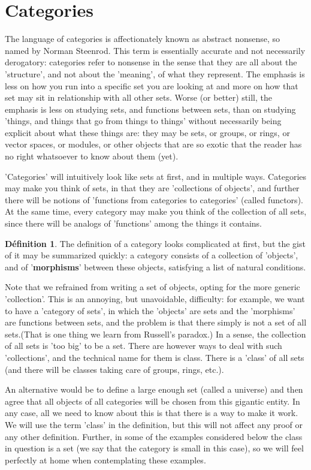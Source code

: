 \documentclass[12pt]{book}
\theoremstyle{definition}\newtheorem{dfn}{Définition}[chapter]
\theoremstyle{plain}\newtheorem{thm}{Théorème}[chapter]
\theoremstyle{plain}\newtheorem{prp}{Proposition}[chapter]
\theoremstyle{plain}\newtheorem{lem}{\bf Lemme}[chapter]
\theoremstyle{plain}\newtheorem{axm}{\bf Axiome}[chapter]
\theoremstyle{plain}\newtheorem{lmm}{\bf Lemme}[chapter]
\theoremstyle{plain}\newtheorem{exm}{\bf Example}[chapter]
\theoremstyle{plain}\newtheorem{cor}{\bf Corollaire}[chapter]
\theoremstyle{remark}\newtheorem{rem}{Remarque}[chapter]
\begin{document}
\section{Categories}
The language of categories is affectionately known as abstract nonsense, so named by Norman Steenrod. This term is essentially accurate and not necessarily derogatory: categories refer to nonsense in the sense that they are all about the 'structure', and not about the 'meaning', of what they represent. The emphasis is less on how you run into a specific set you are looking at and more on how that set may sit in relationship with all other sets. Worse (or better) still, the emphasis is less on studying sets, and functions between sets, than on studying 'things, and things that go from things to things' without necessarily being explicit about what these things are: they may be sets, or groups, or rings, or vector spaces, or modules, or other objects that are so exotic that the reader has no right whatsoever to know about them (yet).

'Categories' will intuitively look like sets at first, and in multiple ways. Categories may make you think of sets, in that they are 'collections of objects', and further there will be notions of 'functions from categories to categories' (called functors). At the same time, every category may make you think of the collection of all sets, since there will be analogs of 'functions' among the things it contains.

\begin{dfn}
The definition of a category looks complicated at first, but the gist of it may be summarized quickly: a category consists of a collection of 'objects', and of '{\bf morphisms}' between these objects, satisfying a list of natural conditions.
\end{dfn} 

Note that we refrained from writing a set of objects, opting for the more generic 'collection'. This is an annoying, but unavoidable, difficulty: for example, we want to have a 'category of sets', in which the 'objects' are sets and the 'morphisms' are functions between sets, and the problem is that there simply is not a set of all sets.(That is one thing we learn from Russell’s paradox.) In a sense, the collection of all sets is 'too big' to be a set. There are however ways to deal with such 'collections', and the technical name for them is class. There is a 'class' of all sets (and there will be classes taking care of groups, rings, etc.).

An alternative would be to define a large enough set (called a universe) and then agree that all objects of all categories will be chosen from this gigantic entity. In any case, all we need to know about this is that there is a way to make it work. We will use the term 'class' in the definition, but this will not affect any proof or any other definition. Further, in some of the examples considered below the class in question is a set (we say that the category is small in this case), so we will feel perfectly at home when contemplating these examples.
\end{document}
